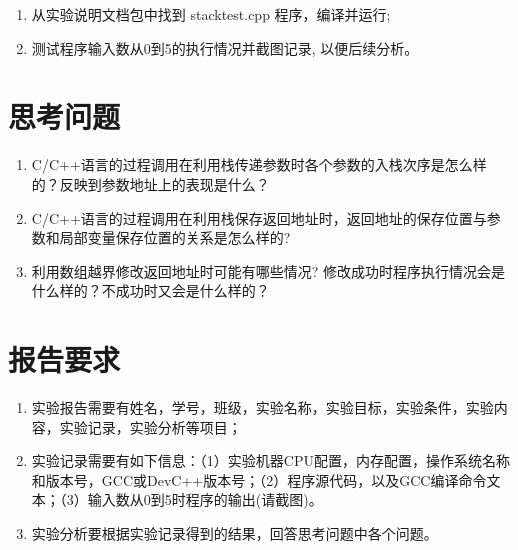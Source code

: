 \begin{enumerate}
	\item 从实验说明文档包中找到 stacktest.cpp 程序，编译并运行;
	\item 测试程序输入数从0到5的执行情况并截图记录, 以便后续分析。
\end{enumerate}

\section{思考问题}

\begin{enumerate}
	\item C/C++语言的过程调用在利用栈传递参数时各个参数的入栈次序是怎么样的？反映到参数地址上的表现是什么？
	\item C/C++语言的过程调用在利用栈保存返回地址时，返回地址的保存位置与参数和局部变量保存位置的关系是怎么样的?
	\item 利用数组越界修改返回地址时可能有哪些情况? 修改成功时程序执行情况会是什么样的？不成功时又会是什么样的？
\end{enumerate}

\section{报告要求}

\begin{enumerate}
	\item 实验报告需要有姓名，学号，班级，实验名称，实验目标，实验条件，实验内容，实验记录，实验分析等项目；
	\item 实验记录需要有如下信息：（1）实验机器CPU配置，内存配置，操作系统名称和版本号，GCC或DevC++版本号；（2）程序源代码，以及GCC编译命令文本；（3）输入数从0到5时程序的输出(请截图)。
	\item 实验分析要根据实验记录得到的结果，回答思考问题中各个问题。
\end{enumerate}

